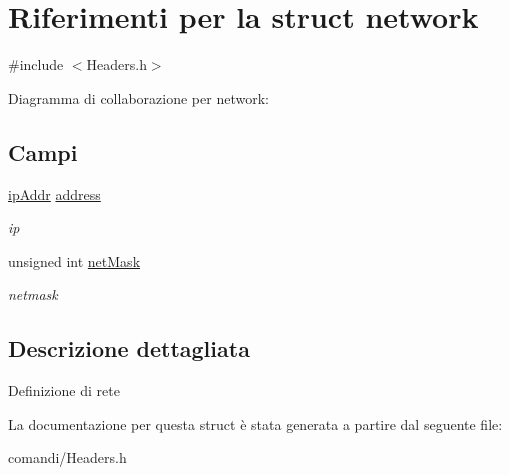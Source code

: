 \hypertarget{structnetwork}{}\section{Riferimenti per la struct network}
\label{structnetwork}


{\ttfamily \#include $<$Headers.\+h$>$}



Diagramma di collaborazione per network\+:
\subsection*{Campi}
\begin{DoxyCompactItemize}
\item 
\hyperlink{unionipAddr}{ip\+Addr} \hyperlink{structnetwork_aadfdf4cd8bd0c69641dbbdcc6376bb10}{address}\hypertarget{structnetwork_aadfdf4cd8bd0c69641dbbdcc6376bb10}{}\label{structnetwork_aadfdf4cd8bd0c69641dbbdcc6376bb10}

\begin{DoxyCompactList}\small\item\em ip \end{DoxyCompactList}\item 
unsigned int \hyperlink{structnetwork_a4b43d7f804814ac38a81108cfc538969}{net\+Mask}\hypertarget{structnetwork_a4b43d7f804814ac38a81108cfc538969}{}\label{structnetwork_a4b43d7f804814ac38a81108cfc538969}

\begin{DoxyCompactList}\small\item\em netmask \end{DoxyCompactList}\end{DoxyCompactItemize}


\subsection{Descrizione dettagliata}
Definizione di rete 

La documentazione per questa struct è stata generata a partire dal seguente file\+:\begin{DoxyCompactItemize}
\item 
comandi/Headers.\+h\end{DoxyCompactItemize}
